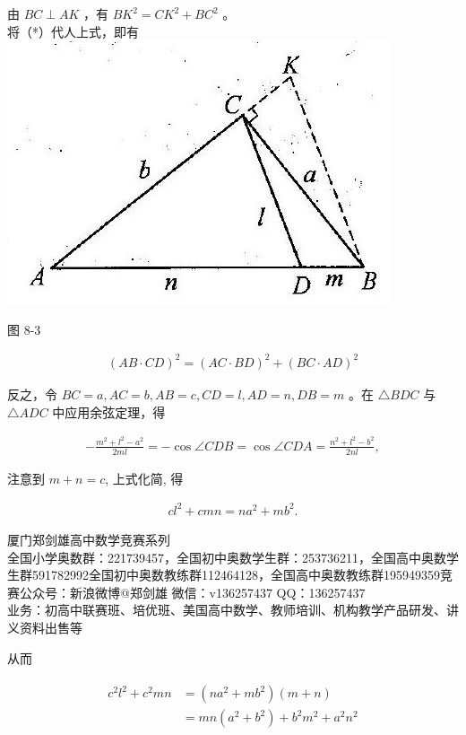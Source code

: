 \documentclass[10pt]{article}
\begin{document}
由 $B C \perp A K$ ，有 $B K^{2}=C K^{2}+B C^{2}$ 。\\
将（*）代人上式，即有\\
\includegraphics[max width=\textwidth, center]{2024_10_30_2c8f45efd4a519b08e1ag-082}

图 8-3

\begin{align*}
(A B \cdot C D)^{2}=(A C \cdot B D)^{2}+(B C \cdot A D)^{2}
\end{align*}

反之，令 $B C=a, A C=b, A B=c, C D=l, A D=n, D B=m$ 。在 $\triangle B D C$ 与 $\triangle A D C$ 中应用余弦定理，得

\begin{align*}
-\frac{m^{2}+l^{2}-a^{2}}{2 m l}=-\cos \angle C D B=\cos \angle C D A=\frac{n^{2}+l^{2}-b^{2}}{2 n l},
\end{align*}

注意到 $m+n=c$, 上式化简, 得

\begin{align*}
c l^{2}+c m n=n a^{2}+m b^{2} .
\end{align*}

厦门郑剑雄高中数学竞赛系列\\
全国小学奥数群：221739457，全国初中奥数学生群：253736211，全国高中奥数学生群591782992全国初中奥数教练群112464128，全国高中奥数教练群195949359竞赛公众号：新浪微博@郑剑雄 微信：v136257437 QQ：136257437\\
业务：初高中联赛班、培优班、美国高中数学、教师培训、机构教学产品研发、讲义资料出售等

从而

\begin{align*}
\begin{aligned}
c^{2} l^{2}+c^{2} m n & =\left(n a^{2}+m b^{2}\right)(m+n) \\
& =m n\left(a^{2}+b^{2}\right)+b^{2} m^{2}+a^{2} n^{2}
\end{aligned}
\end{align*}
\end{document}
